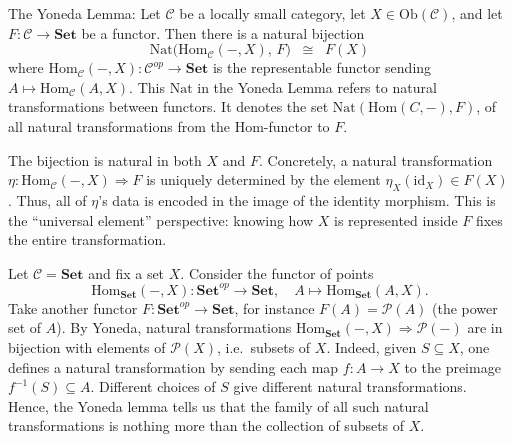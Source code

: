\begin{theorem} The Yoneda Lemma: Let $\mathcal{C}$ be a locally small category, let $X \in \mathrm{Ob}(\mathcal{C})$, 
  and let $F : \mathcal{C} \to \mathbf{Set}$ be a functor. Then there is a natural bijection
  \[
    \mathrm{Nat}\!\big(\mathrm{Hom}_{\mathcal{C}}(-,X), \, F\big) 
    \;\;\cong\;\; F(X)
  \]
  where $\mathrm{Hom}_{\mathcal{C}}(-,X) : \mathcal{C}^{op} \to \mathbf{Set}$ 
  is the representable functor sending $A \mapsto \mathrm{Hom}_{\mathcal{C}}(A,X)$.
  This $\mathrm{Nat}$ in the Yoneda Lemma refers to natural transformations between functors.  
  It denotes the set $\mathrm{Nat}(\mathrm{Hom}(C,-),F)$, of all natural transformations from the Hom-functor to $F$.
\end{theorem}

\begin{remark}
  The bijection is natural in both $X$ and $F$. 
  Concretely, a natural transformation 
  $\eta : \mathrm{Hom}_{\mathcal{C}}(-,X) \Rightarrow F$ 
  is uniquely determined by the element 
  $\eta_X(\mathrm{id}_X) \in F(X)$.
  Thus, all of $\eta$'s data is encoded in the image of the identity morphism.
  This is the ``universal element'' perspective: 
  knowing how $X$ is represented inside $F$ fixes the entire transformation.
\end{remark}

\begin{example}
  Let $\mathcal{C} = \mathbf{Set}$ and fix a set $X$.  
  Consider the functor of points
  \[
    \mathrm{Hom}_{\mathbf{Set}}(-,X) : \mathbf{Set}^{op} \to \mathbf{Set}, 
    \quad A \mapsto \mathrm{Hom}_{\mathbf{Set}}(A,X).
  \]
  Take another functor $F : \mathbf{Set}^{op} \to \mathbf{Set}$, for instance 
  $F(A) = \mathcal{P}(A)$ (the power set of $A$).  
  By Yoneda, natural transformations 
  $\mathrm{Hom}_{\mathbf{Set}}(-,X) \Rightarrow \mathcal{P}(-)$ 
  are in bijection with elements of $\mathcal{P}(X)$, i.e.\ subsets of $X$.  
  Indeed, given $S \subseteq X$, one defines a natural transformation 
  by sending each map $f : A \to X$ to the preimage $f^{-1}(S) \subseteq A$.  
  Different choices of $S$ give different natural transformations.  
  Hence, the Yoneda lemma tells us that the family of all such natural
  transformations is nothing more than the collection of subsets of $X$.
\end{example}

